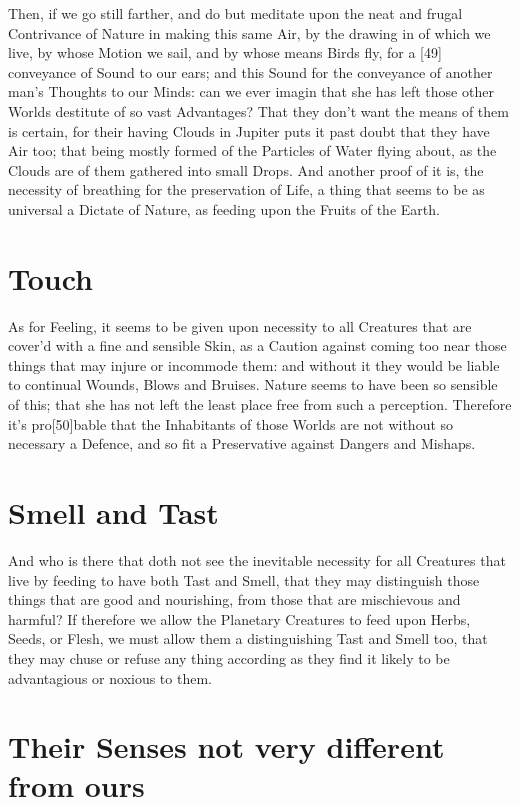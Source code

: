 \documentclass[letterpaper]{book}
\begin{document}
Then, if we go still farther, and do but meditate upon the neat and frugal
Contrivance of Nature in making this same Air, by the drawing in of which we
live, by whose Motion we sail, and by whose means Birds fly, for a [49]
conveyance of Sound to our ears; and this Sound for the conveyance of
another man's Thoughts to our Minds: can we ever imagin that she has left
those other Worlds destitute of so vast Advantages? That they don't want the
means of them is certain, for their having Clouds in Jupiter puts it past
doubt that they have Air too; that being mostly formed of the Particles of
Water flying about, as the Clouds are of them gathered into small Drops.
And another proof of it is, the necessity of breathing for the preservation
of Life, a thing that seems to be as universal a Dictate of Nature, as
feeding upon the Fruits of the Earth.


\section{Touch}

As for Feeling, it seems to be given upon necessity to all Creatures that
are cover'd with a fine and sensible Skin, as a Caution against coming too
near those things that may injure or incommode them: and without it they
would be liable to continual Wounds, Blows and Bruises. Nature seems to have
been so sensible of this; that she has not left the least place free from
such a perception. Therefore it's pro[50]bable that the Inhabitants of those
Worlds are not without so necessary a Defence, and so fit a Preservative
against Dangers and Mishaps.


\section{Smell and Tast}

And who is there that doth not see the inevitable necessity for all Creatures
that live by feeding to have both Tast and Smell, that they may distinguish
those things that are good and nourishing, from those that are mischievous
and harmful? If therefore we allow the Planetary Creatures to feed upon
Herbs, Seeds, or Flesh, we must allow them a distinguishing Tast and Smell
too, that they may chuse or refuse any thing according as they find it likely
to be advantagious or noxious to them.


\section{Their Senses not very different from ours}
\end{document}
